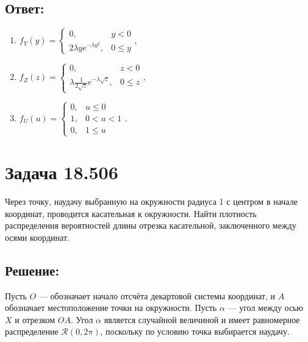 \subsection*{Ответ:}
\begin{enumerate}
    \item
    $
    f_Y(y)
    = \left \{
    \begin{array}{ll}
        0 ,                            & y < 0   \\
        2 \lambda y e^{- \lambda y^2}, & 0 \le y
    \end{array}
    \right .
    ,
    $
    \item
    $
    f_Z(z)
    = \left \{
    \begin{array}{ll}
        0,                                                   & z < 0   \\
        \lambda \frac{1}{2 \sqrt{z}} e^{- \lambda \sqrt{z}}, & 0 \le z
    \end{array}
    \right .
    ,
    $
    \item
    $
    f_U(u)
    = \left \{
    \begin{array}{ll}
        0,  & u \le 0   \\
        1 , & 0 < u < 1 \\
        0,  & 1 \le u
    \end{array}
    \right .
    .
    $
\end{enumerate}

\section*{Задача 18.506}

Через точку, наудачу выбранную на окружности радиуса 1 с центром в начале координат, проводится касательная к окружности. Найти плотность распределения вероятностей
длины отрезка касательной, заключенного между осями координат.

\subsection*{Решение:}
Пусть $O$ --- обозначает начало отсчёта декартовой системы координат, и $A$ обозначает местоположение точки на окружности. Пусть $\alpha$ --- угол между осью $X$ и
отрезком $OA$. Угол $\alpha$ является случайной величиной и имеет равномерное распределение $\mathcal{R}(0, 2 \pi)$, поскольку по условию точка выбирается наудачу.

